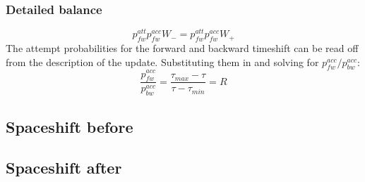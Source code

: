 \documentclass[12pt, two sided]{article}
\begin{document}
    \subsubsection{Detailed balance}
    \begin{equation}
    p_{fw}^{att} p_{fw}^{acc} W_- = p_{fw}^{att} p_{fw}^{acc} W_+
    \end{equation}
    The attempt probabilities for the forward and backward timeshift can be read off from the description of the update. Substituting them in and solving for $p_{fw}^{acc}/p_{bw}^{acc}$:
    \begin{equation}
    \frac{p_{fw}^{acc}}{p_{bw}^{acc}} = \frac{\tau_{max}-\tau}{\tau-\tau_{min}} = R
    \end{equation}

	\subsection{Spaceshift before}
	\subsection{Spaceshift after}
	
{} 
 \singlespacing


\doublespacing
\end{document}
